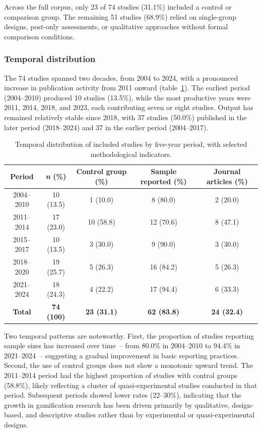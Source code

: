 \documentclass[etq]{acnsart}
\begin{document}
	Across the full corpus, only 23 of 74 studies (31.1\%) included a control or comparison group. The remaining 51 studies (68.9\%) relied on single-group designs, post-only assessments, or qualitative approaches without formal comparison conditions.
	
	\subsubsection{Temporal distribution}
	\label{sec:results_rq1_temporal}
	
	The 74 studies spanned two decades, from 2004 to 2024, with a pronounced increase in publication activity from 2011 onward (table~\ref{tab:temporal_dist}). The earliest period (2004--2010) produced 10 studies (13.5\%), while the most productive years were 2011, 2014, 2018, and 2023, each contributing seven or eight studies. Output has remained relatively stable since 2018, with 37 studies (50.0\%) published in the later period (2018--2024) and 37 in the earlier period (2004--2017).
	
	\begin{table}[ht]
		\centering
		\caption{Temporal distribution of included studies by five-year period, with selected methodological indicators.}
		\label{tab:temporal_dist}
		\small
		\begin{tabular}{@{}ccccc@{}}
			\toprule
			\textbf{Period} & \textbf{\textit{n} (\%)} & \textbf{Control group (\%)} & \textbf{Sample reported (\%)} & \textbf{Journal articles (\%)} \\
			\midrule
			2004--2010 & 10 (13.5) & 1 (10.0) & 8 (80.0) & 2 (20.0) \\
			2011--2014 & 17 (23.0) & 10 (58.8) & 12 (70.6) & 8 (47.1) \\
			2015--2017 & 10 (13.5) & 3 (30.0) & 9 (90.0) & 3 (30.0) \\
			2018--2020 & 19 (25.7) & 5 (26.3) & 16 (84.2) & 5 (26.3) \\
			2021--2024 & 18 (24.3) & 4 (22.2) & 17 (94.4) & 6 (33.3) \\
			\midrule
			\textbf{Total} & \textbf{74 (100)} & \textbf{23 (31.1)} & \textbf{62 (83.8)} & \textbf{24 (32.4)} \\
			\bottomrule
		\end{tabular}
	\end{table}
	
	Two temporal patterns are noteworthy. First, the proportion of studies reporting sample sizes has increased over time~-- from 80.0\% in 2004--2010 to 94.4\% in 2021--2024~-- suggesting a gradual improvement in basic reporting practices. Second, the use of control groups does not show a monotonic upward trend. The 2011--2014 period had the highest proportion of studies with control groups (58.8\%), likely reflecting a cluster of quasi-experimental studies conducted in that period. Subsequent periods showed lower rates (22--30\%), indicating that the growth in gamification research has been driven primarily by qualitative, design-based, and descriptive studies rather than by experimental or quasi-experimental designs.
	
\end{document}
